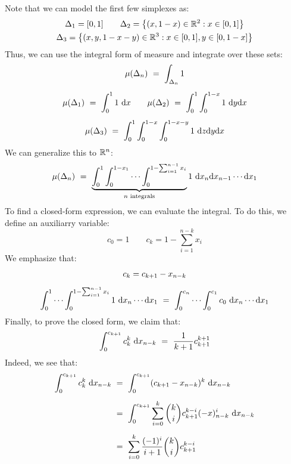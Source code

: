 \begin{soln}
    Note that we can model the first few simplexes as:
    \begin{gather*}
        \Delta_{1} = [0, 1] \qquad
        \Delta_{2} = \left\{{(x, 1-x) \in \mathbb{R}^{2} : x \in [0, 1]}\right\} \\
        \Delta_{3} = \left\{{(x, y, 1-x-y) \in \mathbb{R}^{3} : x \in [0, 1], y \in
        [0, 1-x]}\right\}
    \end{gather*}
    Thus, we can use the integral form of measure and integrate over these sets:
    \begin{gather*}
        \mu(\Delta_{n}) \ = \ \int_{\Delta_{n}}1 \vsp
        \mu(\Delta_{1}) \ = \ \int_{0}^{1}1\ \d x \qquad
        \mu(\Delta_{2}) \ = \ \int_{0}^{1}\int_{0}^{1-x}1\ \d y\d x \vsp
        \mu(\Delta_{3}) \ = \ \int_{0}^{1}\int_{0}^{1-x}\int_{0}^{1-x-y}
        1\ \d z\d y\d x
    \end{gather*}
    We can generalize this to $ \mathbb{R}^{n} $:
    \begin{equation*}
        \mu(\Delta_{n}) \ = \ \underbrace{
            \int_{0}^{1}\int_{0}^{1-x_{1}}\cdots
            \int_{0}^{1-\sum_{i=1}^{n-1}x_{i}}
        }_{n \textrm{ integrals}} 1\ \textrm{d} x_{n}\textrm{d} x_{n-1}\cdots \textrm{d} x_{1}
    \end{equation*}
    To find a closed-form expression, we can evaluate the integral.
    To do this, we define an auxiliarry variable:
    \begin{equation*}
        c_{0} = 1 \qquad c_{k} = 1 - \sum_{i=1}^{n-k}x_{i}
    \end{equation*}
    We emphasize that:
    \begin{gather*}
        c_{k} = c_{k+1}-x_{n-k} \vsp
        \int_{0}^{1}\cdots
        \int_{0}^{1-\sum_{i=1}^{n-1}x_{i}}
        1\ \d x_{n}\cdots \d x_{1} \ = \
        \int_{0}^{c_{n}}\cdots
        \int_{0}^{c_{1}}
        c_{0}\ \d x_{n}\cdots \d x_{1}
    \end{gather*}
    Finally, to prove the closed form, we claim that:
    \begin{equation*}
        \int_{0}^{c_{k+1}}c_{k}^{k}\ \textrm{d} x_{n-k} \ = \
        \frac{1}{k+1}c_{k+1}^{k+1}
    \end{equation*}
    Indeed, we see that:
    \begin{align*}
        \int_{0}^{c_{k+1}}c_{k}^{k}\ \d x_{n-k}
        & \ = \ \int_{0}^{c_{k+1}}(c_{k+1}-x_{n-k})^{k}\ \d x_{n-k} \vsp
        & \ = \ \int_{0}^{c_{k+1}}\sum_{i=0}^{k}\binom k i c_{k+1}^{k-i}
        (-x)_{n-k}^{i}\ \d x_{n-k} \vsp
        & \ = \ \sum_{i=0}^{k}\frac{(-1)^{i}}{i+1}\binom k ic_{k+1}^{k-i}

\end{align*}
\end{soln}
